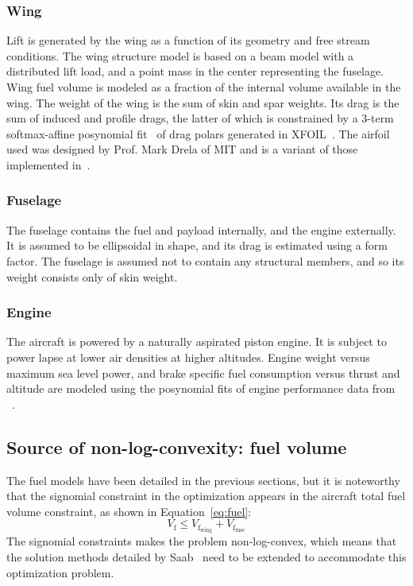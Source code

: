 \subsubsection{Wing}

Lift is generated by the wing as a function of its geometry and free stream conditions.
The wing structure model is based on a beam model with a distributed lift load,
and a point mass in the center representing the fuselage.
Wing fuel volume is modeled as a fraction of the internal volume available in the wing.
The weight of the wing is the sum of skin and spar weights.
Its drag is the sum of induced and profile drags, the latter of which is
constrained by a 3-term softmax-affine posynomial fit~\cite{Hoburg2016} of drag polars
generated in XFOIL~\cite{XFOIL}.
The airfoil used was designed by Prof. Mark Drela of MIT and
is a variant of those implemented in~\cite{Burton2017}.

\subsubsection{Fuselage}

The fuselage contains the fuel and payload internally, and the engine externally.
It is assumed to be ellipsoidal in shape, and its drag is estimated using a form factor.
The fuselage is assumed not to contain any structural members, and so its weight consists only of skin weight.

\subsubsection{Engine}

The aircraft is powered by a naturally aspirated piston engine. It is subject to
power lapse at lower air densities at higher altitudes. Engine weight versus maximum sea level power,
and brake specific fuel consumption versus thrust and altitude
are modeled using the posynomial fits of engine performance data from ~\cite{Ozturk2017}.

\subsection{Source of non-log-convexity: fuel volume}
The fuel models have been detailed in the previous sections, but it is noteworthy that
the signomial constraint in the optimization appears in the aircraft total fuel volume constraint,
as shown in Equation~\ref{eq:fuel}:
\begin{equation}
\label{eq:fuel}
V_{\mathrm{f}} \leq V_{\mathrm{f_{wing}}} + V_{\mathrm{f_{fuse}}}
\end{equation}
The signomial constraints makes the problem non-log-convex, which means that the solution methods
detailed by Saab~\cite{Saab2018} need to be extended to accommodate this optimization problem.
